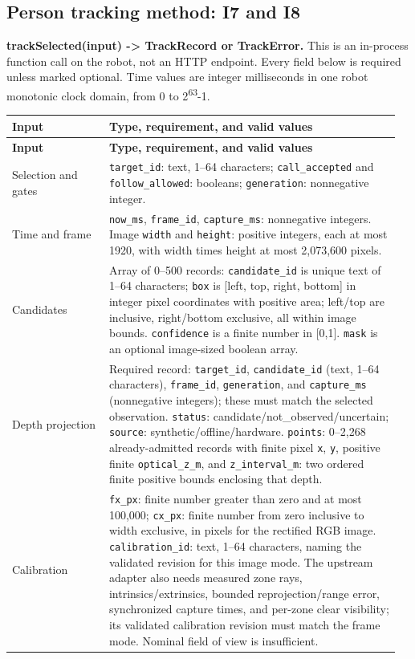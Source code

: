 \documentclass[12pt,letterpaper]{article}
\newcommand{\field}[1]{\texttt{#1}}
\begin{document}
\subsection*{Person tracking method: I7 and I8}

\textbf{trackSelected(input) -> TrackRecord or TrackError.} This is an in-process function call on the robot, not an HTTP endpoint. Every field below is required unless marked optional. Time values are integer milliseconds in one robot monotonic clock domain, from 0 to 2\textsuperscript{63}-1.

\begingroup\small
\begin{longtable}{@{}>{\RaggedRight\arraybackslash}p{0.24\linewidth}>{\RaggedRight\arraybackslash}p{0.72\linewidth}@{}}
\toprule\textbf{Input} & \textbf{Type, requirement, and valid values}\\\midrule\endfirsthead
\toprule\textbf{Input} & \textbf{Type, requirement, and valid values}\\\midrule\endhead
\midrule\endfoot\bottomrule\endlastfoot
Selection and gates & \field{target\_id}: text, 1--64 characters; \field{call\_accepted} and \field{follow\_allowed}: booleans; \field{generation}: nonnegative integer. \\
Time and frame & \field{now\_ms}, \field{frame\_id}, \field{capture\_ms}: nonnegative integers. Image \field{width} and \field{height}: positive integers, each at most 1920, with width times height at most 2,073,600 pixels. \\
Candidates & Array of 0--500 records: \field{candidate\_id} is unique text of 1--64 characters; \field{box} is [left, top, right, bottom] in integer pixel coordinates with positive area; left/top are inclusive, right/bottom exclusive, all within image bounds. \field{confidence} is a finite number in [0,1]. \field{mask} is an optional image-sized boolean array. \\
Depth projection & Required record: \field{target\_id}, \field{candidate\_id} (text, 1--64 characters), \field{frame\_id}, \field{generation}, and \field{capture\_ms} (nonnegative integers); these must match the selected observation. \field{status}: candidate/not\_observed/uncertain; \field{source}: synthetic/offline/hardware. \field{points}: 0--2,268 already-admitted records with finite pixel \field{x}, \field{y}, positive finite \field{optical\_z\_m}, and \field{z\_interval\_m}: two ordered finite positive bounds enclosing that depth. \\
Calibration & \field{fx\_px}: finite number greater than zero and at most 100,000; \field{cx\_px}: finite number from zero inclusive to width exclusive, in pixels for the rectified RGB image. \field{calibration\_id}: text, 1--64 characters, naming the validated revision for this image mode. The upstream adapter also needs measured zone rays, intrinsics/extrinsics, bounded reprojection/range error, synchronized capture times, and per-zone clear visibility; its validated calibration revision must match the frame mode. Nominal field of view is insufficient. \\

\end{longtable}
\end{document}
